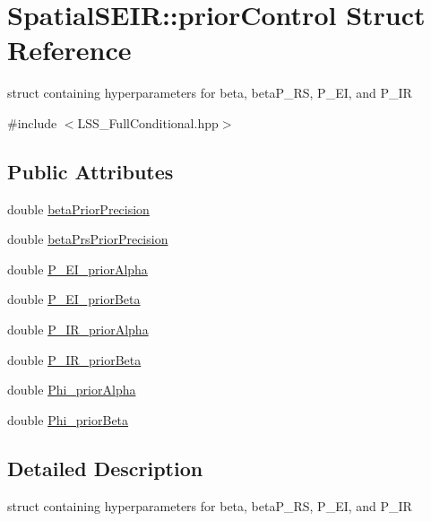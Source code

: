 \hypertarget{structSpatialSEIR_1_1priorControl}{\section{Spatial\-S\-E\-I\-R\-:\-:prior\-Control Struct Reference}
\label{structSpatialSEIR_1_1priorControl}
}


struct containing hyperparameters for beta, beta\-P\-\_\-\-R\-S, P\-\_\-\-E\-I, and P\-\_\-\-I\-R  




{\ttfamily \#include $<$L\-S\-S\-\_\-\-Full\-Conditional.\-hpp$>$}

\subsection*{Public Attributes}
\begin{DoxyCompactItemize}
\item 
double \hyperlink{structSpatialSEIR_1_1priorControl_a09b61ec7e9aeffb5240b2deb91c2caa7}{beta\-Prior\-Precision}
\item 
double \hyperlink{structSpatialSEIR_1_1priorControl_a217fafa2c871f52851ddf117fa102a99}{beta\-Prs\-Prior\-Precision}
\item 
double \hyperlink{structSpatialSEIR_1_1priorControl_a480e374c2292f8c4ec4001b9200d3c98}{P\-\_\-\-E\-I\-\_\-prior\-Alpha}
\item 
double \hyperlink{structSpatialSEIR_1_1priorControl_a03121f3205c6a9ad8b9eba19bc2d984a}{P\-\_\-\-E\-I\-\_\-prior\-Beta}
\item 
double \hyperlink{structSpatialSEIR_1_1priorControl_ae6a48c90f4a28e0cc242a0864644a642}{P\-\_\-\-I\-R\-\_\-prior\-Alpha}
\item 
double \hyperlink{structSpatialSEIR_1_1priorControl_a45f1c9863d642145a6a925dde62a72d3}{P\-\_\-\-I\-R\-\_\-prior\-Beta}
\item 
double \hyperlink{structSpatialSEIR_1_1priorControl_accf33362a63601c86f7e6eba8f9697b6}{Phi\-\_\-prior\-Alpha}
\item 
double \hyperlink{structSpatialSEIR_1_1priorControl_aff5ff73b4770a50aeeb70a90821f73df}{Phi\-\_\-prior\-Beta}
\end{DoxyCompactItemize}


\subsection{Detailed Description}
struct containing hyperparameters for beta, beta\-P\-\_\-\-R\-S, P\-\_\-\-E\-I, and P\-\_\-\-I\-R 

